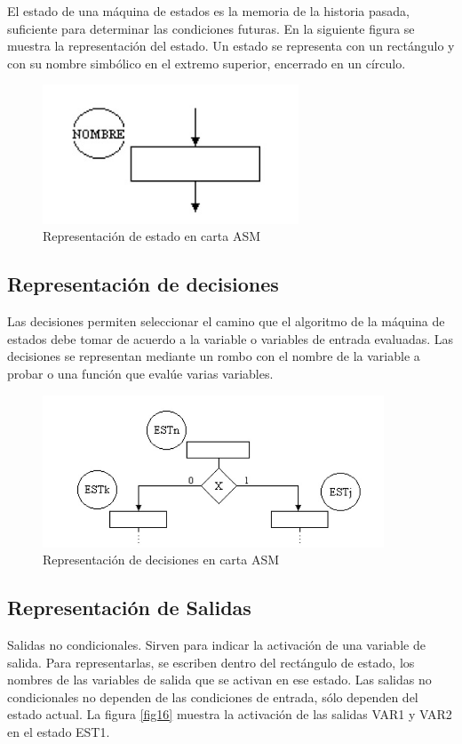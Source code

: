 \documentclass[12pt]{book}
\theoremstyle{definition}
\theoremstyle{remark}
\theoremstyle{plain}
\begin{document}
El estado de una máquina de estados es la memoria de la historia pasada, suficiente para
determinar las condiciones futuras. En la siguiente figura se muestra la representación del estado.
Un estado se representa con un rectángulo y con su nombre simbólico en el extremo superior,
encerrado en un círculo.


\begin{figure}
\centering
\includegraphics[width=3in]{ASMestado.jpg}
\caption{Representación de estado en carta ASM}
\label{fig14}
\end{figure}

\subsection{Representación de decisiones }

Las decisiones permiten seleccionar el camino que el algoritmo de la máquina de estados debe
tomar de acuerdo a la variable o variables de entrada evaluadas. Las decisiones se representan
mediante un rombo con el nombre de la variable a probar o una función que evalúe varias variables.

\begin{figure}
\centering
\includegraphics[width=4in]{ASMdecisiones.jpg}
\caption{Representación de decisiones en carta ASM}
\label{fig15}
\end{figure}

\subsection{Representación de Salidas}

Salidas no condicionales. Sirven para indicar la activación de una variable de salida. Para
representarlas, se escriben dentro del rectángulo de estado, los nombres de las variables de salida
que se activan en ese estado. Las salidas no condicionales no dependen de las condiciones de
entrada, sólo dependen del estado actual. La figura \ref{fig16} muestra la activación de las salidas VAR1 y
VAR2 en el estado EST1.
\end{document}
